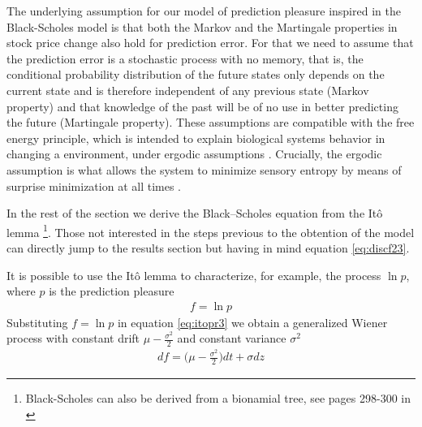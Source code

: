 \documentclass[11pt, onecolumn]{article}
\begin{document}
The underlying assumption for our model of prediction pleasure inspired in the Black-Scholes model is that both the Markov and the Martingale properties in stock price change also hold for prediction error. For that we need to assume that the prediction error is a stochastic process with no memory, that is, the conditional probability distribution of the future states only depends on the current state and is therefore independent of any previous state (Markov property) and that knowledge of the past will be of no use in better predicting the future (Martingale property). These assumptions are compatible with the free energy principle, which is intended to explain biological systems behavior in changing a environment, under ergodic assumptions \citep{birkhoff_proof_1931}. Crucially, the ergodic assumption is what allows the system to minimize sensory entropy by means of surprise minimization at all times \citep{friston_action_2010}. 

In the rest of the section we derive the Black–Scholes equation from the It\^{o} lemma \citep{ito_stochastic_1951} \footnote{Black-Scholes can  also be derived from a bionamial tree, see pages 298-300 in \citep{hull_options_2011}}. Those not interested in the steps previous to the obtention of the model can directly jump to  the results section but having in mind equation \ref{eq:discf23}.


It is possible to use the  It\^{o} lemma to characterize, for example, the process $\ln p$, where $p$ is the prediction pleasure
\begin{equation*}
\begin{split}
  f = \ln p
\end{split}
\label{eq:slns}
\end{equation*} 
Substituting $f = \ln p$ in equation \ref{eq:itopr3} we obtain a generalized Wiener process with constant drift $\mu - \frac{\sigma^2}{2}$ and constant variance $\sigma^2$ 
\begin{equation*}
\begin{split}
df =  \bigg( \mu - \frac{\sigma^2}{2} \bigg)dt + \sigma dz
\end{split}
\label{eq:slns2}
\end{equation*} 
\end{document}
